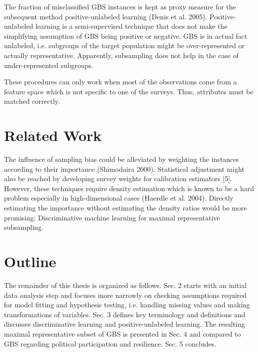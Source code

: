 The fraction of misclassified GBS instances is kept as proxy measure for the subsequent method positive-unlabeled learning (Denis et al. 2005). Positive-unlabeled learning is a semi-supervised technique that does not make the simplifying assumption of GBS being positive or negative. GBS is in actual fact unlabeled, i.e. subgroups of the target population might be over-represented or actually representative. Apparently, subsampling does not help in the case of under-represented subgroups.

These procedures can only work when most of the observations come from a feature space which is not specific to one of the surveys. Thus, attributes must be matched correctly. 

\section{Related Work}

The influence of sampling bias could be alleviated by weighting the instances according to their importance (Shimodaira 2000). Statistical adjustment might also be reached by developing survey weights for calibration estimators [5]. However, these techniques require density estimation which is known to be a hard problem especially in high-dimensional cases (Haerdle et al. 2004). Directly estimating the importance without estimating the density ratios would be more promising: Discriminative machine learning for maximal representative subsampling.

\section{Outline}

The remainder of this thesis is organized as follows. Sec. 2 starts with an initial data analysis step and focuses more narrowly on checking assumptions required for model fitting and hypothesis testing, i.e. handling missing values and making transformations of variables. Sec. 3 defines key terminology and definitions and discusses discriminative learning and positive-unlabeled learning. The resulting maximal representative subset of GBS is presented in Sec. 4 and compared to GBS regarding political participation and resilience. Sec. 5 concludes.
